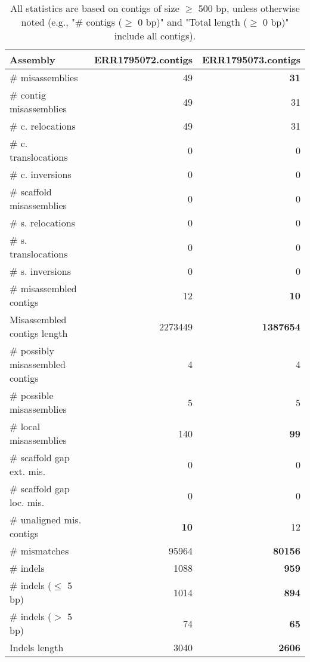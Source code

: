 \documentclass[12pt,a4paper]{article}
\begin{document}
\begin{table}[ht]
\begin{center}
\caption{All statistics are based on contigs of size $\geq$ 500 bp, unless otherwise noted (e.g., "\# contigs ($\geq$ 0 bp)" and "Total length ($\geq$ 0 bp)" include all contigs).}
\begin{tabular}{|l*{2}{|r}|}
\hline
Assembly & ERR1795072.contigs & ERR1795073.contigs \\ \hline
\# misassemblies & 49 & {\bf 31} \\ \hline
\hspace{2mm}\# contig misassemblies & 49 & 31 \\ \hline
\hspace{5mm}\# c. relocations & 49 & 31 \\ \hline
\hspace{5mm}\# c. translocations & 0 & 0 \\ \hline
\hspace{5mm}\# c. inversions & 0 & 0 \\ \hline
\hspace{2mm}\# scaffold misassemblies & 0 & 0 \\ \hline
\hspace{5mm}\# s. relocations & 0 & 0 \\ \hline
\hspace{5mm}\# s. translocations & 0 & 0 \\ \hline
\hspace{5mm}\# s. inversions & 0 & 0 \\ \hline
\# misassembled contigs & 12 & {\bf 10} \\ \hline
Misassembled contigs length & 2273449 & {\bf 1387654} \\ \hline
\# possibly misassembled contigs & 4 & 4 \\ \hline
\hspace{5mm}\# possible misassemblies & 5 & 5 \\ \hline
\# local misassemblies & 140 & {\bf 99} \\ \hline
\# scaffold gap ext. mis. & 0 & 0 \\ \hline
\# scaffold gap loc. mis. & 0 & 0 \\ \hline
\# unaligned mis. contigs & {\bf 10} & 12 \\ \hline
\# mismatches & 95964 & {\bf 80156} \\ \hline
\# indels & 1088 & {\bf 959} \\ \hline
\hspace{5mm}\# indels ($\leq$ 5 bp) & 1014 & {\bf 894} \\ \hline
\hspace{5mm}\# indels ($>$ 5 bp) & 74 & {\bf 65} \\ \hline
Indels length & 3040 & {\bf 2606} \\ \hline
\end{tabular}
\end{center}
\end{table}
\end{document}
